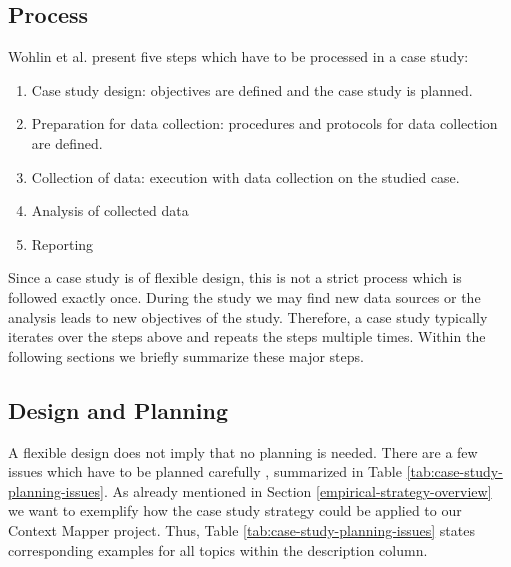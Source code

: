 \documentclass[runningheads]{llncs}
\begin{document}
\subsection{Process}\label{case-study-process}
Wohlin et al. \cite{Wohlin:2012:ESE:2349018} present five steps which have to be processed in a case study:
\begin{enumerate}
	\item Case study design: objectives are defined and the case study is planned.
	\item Preparation for data collection: procedures and protocols for data collection are defined.
	\item Collection of data: execution with data collection on the studied case.
	\item Analysis of collected data
	\item Reporting
\end{enumerate}

Since a case study is of flexible design, this is not a strict process which is followed exactly once. During the study we may find new data sources or the analysis leads to new objectives of the study. Therefore, a case study typically iterates over the steps above and repeats the steps multiple times. Within the following sections we briefly summarize these major steps.

\subsection{Design and Planning}
A flexible design does not imply that no planning is needed. There are a few issues which have to be planned carefully \cite{robson2002real}, summarized in Table \ref{tab:case-study-planning-issues}. As already mentioned in Section \ref{empirical-strategy-overview} we want to exemplify how the case study strategy could be applied to our Context Mapper project. Thus, Table \ref{tab:case-study-planning-issues} states corresponding examples for all topics within the description column.
\end{document}
